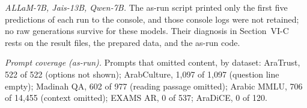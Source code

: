 \emph{ALLaM-7B, Jais-13B, Qwen-7B.} The as-run script printed only the first five
predictions of each run to the console, and those console logs were not retained;
no raw generations survive for these models. Their diagnosis in Section~VI-C rests on
the result files, the prepared data, and the as-run code.

\emph{Prompt coverage (as-run).} Prompts that omitted content, by dataset: AraTrust, 522
of 522 (options not shown); ArabCulture, 1,097 of 1,097 (question line empty); Madinah
QA, 602 of 977 (reading passage omitted); Arabic MMLU, 706 of 14,455 (context
omitted); EXAMS AR, 0 of 537; AraDiCE, 0 of 120.
